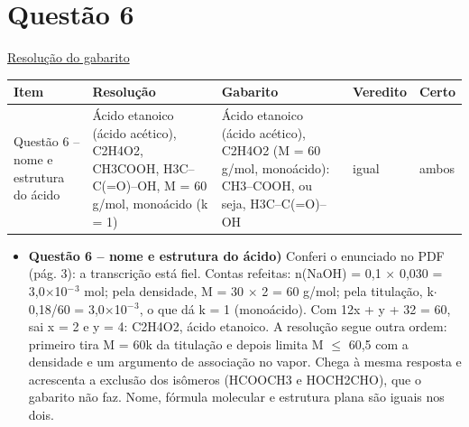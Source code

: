 \documentclass{article}%
\begin{document}
\section*{Questão 6}%
\href{https://poliedroresolve.sistemapoliedro.com.br/vestibulares/ime/2026/ime-2-fase-dia-3-25-10-2025-2-fase-dia-3/dissertativa-6-quimica-2-fase-dia-3-ime-2026}{Resolução do gabarito}\par\smallskip%
\begin{longtable}{@{}p{} p{} p{} p{} p{}@{}}\toprule Item & Resolução & Gabarito & Veredito & Certo \\ \midrule
Questão 6 -- nome e estrutura do ácido & Ácido etanoico (ácido acético), C2H4O2, CH3COOH, H3C--C(=O)--OH, M = 60 g/mol, monoácido (k = 1) & Ácido etanoico (ácido acético), C2H4O2 (M = 60 g/mol, monoácido): CH3--COOH, ou seja, H3C--C(=O)--OH & igual & ambos \\
\bottomrule\end{longtable}%
\begin{itemize}%
\item%
\textbf{Questão 6 -- nome e estrutura do ácido)} Conferi o enunciado no PDF (pág. 3): a transcrição está fiel. Contas refeitas: n(NaOH) = 0,1 $\times$ 0,030 = 3,0$\times$10$^{-}$$^3$ mol; pela densidade, M = 30 $\times$ 2 = 60 g/mol; pela titulação, k$\cdot$0,18/60 = 3,0$\times$10$^{-}$$^3$, o que dá k = 1 (monoácido). Com 12x + y + 32 = 60, sai x = 2 e y = 4: C2H4O2, ácido etanoico. A resolução segue outra ordem: primeiro tira M = 60k da titulação e depois limita M $\leq$ 60,5 com a densidade e um argumento de associação no vapor. Chega à mesma resposta e acrescenta a exclusão dos isômeros (HCOOCH3 e HOCH2CHO), que o gabarito não faz. Nome, fórmula molecular e estrutura plana são iguais nos dois.%
\end{itemize}%
\end{document}
